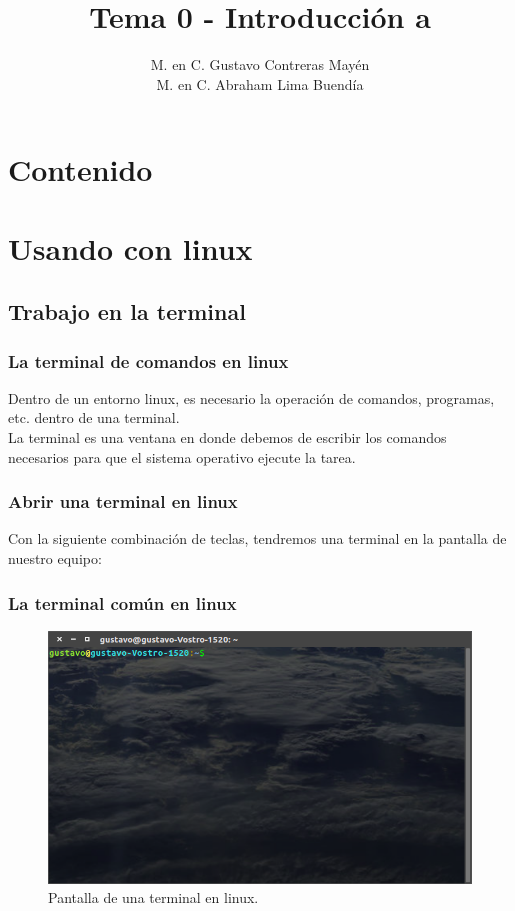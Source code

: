 \documentclass[12pt]{beamer}
\title{Tema 0 - Introducción a \python}
\author[]{M. en C. Gustavo Contreras Mayén \\ M. en C. Abraham Lima Buendía}
\begin{document}
\maketitle
\section*{Contenido}
\fontsize{14}{14}\selectfont
{}
\section{Usando \python{} con linux}
\subsection{Trabajo en la terminal}
\begin{frame}
\frametitle{La terminal de comandos en linux}
Dentro de un entorno linux, es necesario la operación de comandos, programas, etc. dentro de una terminal.
\\
\bigskip
La terminal es una ventana en donde debemos de escribir los comandos necesarios para que el sistema operativo ejecute la tarea.
\end{frame}
\begin{frame}
\frametitle{Abrir una terminal en linux}
Con la siguiente combinación de teclas, tendremos una terminal en la pantalla de nuestro equipo:
\\
\bigskip
\bigskip
\begin{center}
\end{center}
\end{frame}
\begin{frame}
\frametitle{La terminal común en linux}
\begin{figure}
	\centering
	\includegraphics[scale=0.4]{Figuras/Terminal_01.png}
	\caption{Pantalla de una terminal en linux.}
\end{figure}
\end{frame}
\end{document}
